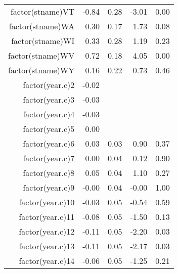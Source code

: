 \begin{table}[ht]
\begin{tabular}{rrrrr}
  factor(stname)VT & -0.84 & 0.28 & -3.01 & 0.00 \\ 
  factor(stname)WA & 0.30 & 0.17 & 1.73 & 0.08 \\ 
  factor(stname)WI & 0.33 & 0.28 & 1.19 & 0.23 \\ 
  factor(stname)WV & 0.72 & 0.18 & 4.05 & 0.00 \\ 
  factor(stname)WY & 0.16 & 0.22 & 0.73 & 0.46 \\ 
  factor(year.c)2 & -0.02 &  &  &  \\ 
  factor(year.c)3 & -0.03 &  &  &  \\ 
  factor(year.c)4 & -0.03 &  &  &  \\ 
  factor(year.c)5 & 0.00 &  &  &  \\ 
  factor(year.c)6 & 0.03 & 0.03 & 0.90 & 0.37 \\ 
  factor(year.c)7 & 0.00 & 0.04 & 0.12 & 0.90 \\ 
  factor(year.c)8 & 0.05 & 0.04 & 1.10 & 0.27 \\ 
  factor(year.c)9 & -0.00 & 0.04 & -0.00 & 1.00 \\ 
  factor(year.c)10 & -0.03 & 0.05 & -0.54 & 0.59 \\ 
  factor(year.c)11 & -0.08 & 0.05 & -1.50 & 0.13 \\ 
  factor(year.c)12 & -0.11 & 0.05 & -2.20 & 0.03 \\ 
  factor(year.c)13 & -0.11 & 0.05 & -2.17 & 0.03 \\ 
  factor(year.c)14 & -0.06 & 0.05 & -1.25 & 0.21 \\ 
   \hline
\end{tabular}
\end{table}
